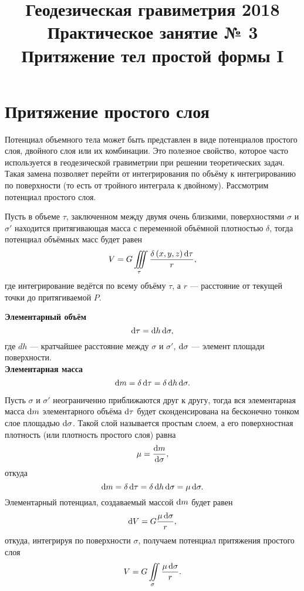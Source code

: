 \documentclass[11pt, a4paper]{article}
\title{{\Large Геодезическая гравиметрия 2018}\\ 
    {\bf\Large Практическое занятие № 3} \\
{\Large Притяжение тел простой формы I}}
\author{}
\date{\DTMusedate{lessondate}}
\theoremstyle{plain}
\theoremstyle{definition}
\theoremstyle{remark}
\begin{document}
\maketitle

\section{Притяжение простого слоя}

Потенциал объемного тела может быть представлен в виде потенциалов простого слоя, двойного слоя или
их комбинации. Это полезное свойство, которое часто используется в геодезической гравиметрии при
решении теоретических задач. Такая замена позволяет перейти от интегрирования по объёму к
интегрированию по поверхности (то есть от тройного интеграла к двойному). Рассмотрим потенциал
простого слоя.

Пусть в объеме $\tau$, заключенном между двумя очень близкими, поверхностями $\sigma$ и $\sigma'$
находится притягивающая масса с переменной объёмной плотностью $\delta$, тогда потенциал объёмных
масс будет равен
\begin{equation*}
    V = G\iiint\limits_{\tau}\dfrac{\delta \left( x, y, z \right)\dif\tau}{r},
\end{equation*}
где интегрирование ведётся по всему объёму $\tau$, а $r$ --- расстояние от текущей 
точки до притягиваемой $P$.

\textbf{Элементарный объём}
\begin{equation*}
    \dif\tau = \dif h\dif\sigma,
\end{equation*}
где $dh$ --- кратчайшее расстояние между $\sigma$ и $\sigma'$,
$\dif\sigma$ --- элемент площади поверхности. \\

\textbf{Элементарная масса}
\begin{equation*}
    \dif m = \delta\dif\tau = \delta\dif h\dif\sigma.
\end{equation*}

Пусть $\sigma$ и $\sigma'$ неограниченно приближаются друг к другу, тогда вся элементарная масса
$\dif m$ элементарного объёма $\dif\tau$ будет сконденсирована на бесконечно тонком слое площадью
$\dif\sigma$. Такой слой называется простым слоем, а его поверхностная плотность (или плотность
простого слоя) равна
\begin{equation*}
    \mu = \dfrac{\dif m }{\dif \sigma},
\end{equation*}
откуда
\begin{equation*}
    \dif m = \delta\dif\tau = \delta\dif h\dif\sigma = \mu\dif\sigma. 
\end{equation*}
Элементарный потенциал, создаваемый массой $\dif m$ будет равен
\begin{equation*}
    \dif V = G\dfrac{\mu\dif\sigma}{r},
\end{equation*}
откуда, интегрируя по поверхности $\sigma$, получаем потенциал притяжения простого слоя
\begin{equation*}
    V = G\iint\limits_{\sigma}\dfrac{\mu\dif\sigma}{r}.
\end{equation*}
\end{document}

